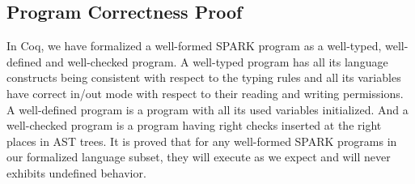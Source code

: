 \subsection{Program Correctness Proof}
In Coq, we have formalized a well-formed SPARK program as a well-typed, well-defined
and well-checked program. 
A well-typed program has all its language constructs being consistent with respect to the 
typing rules and all its variables have correct in/out mode with respect to their reading 
and writing permissions. 
A well-defined program is a program with all its used variables initialized.
And a well-checked program is a program having right checks inserted at the right places
in AST trees.
It is proved that for any well-formed SPARK programs in our formalized language subset, they will
execute as we expect and will never exhibits undefined behavior.